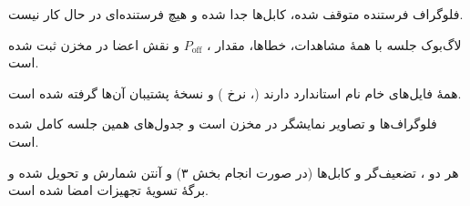 \documentclass[a4paper,11pt]{article}
\begin{document}
\begin{checklist}
\item فلوگراف فرستنده متوقف شده، کابل‌ها جدا شده و هیچ فرستنده‌ای در حال کار نیست.
\item لاگ‌بوک جلسه با همهٔ مشاهدات، خطاها، مقدار
،
$P_{\mathrm{off}}$
و نقش اعضا در مخزن ثبت شده است.
\item همهٔ فایل‌های خام
\IQ{}
نام استاندارد دارند
(،
نرخ
)
و نسخهٔ پشتیبان آن‌ها گرفته شده است.
\item فلوگراف‌ها و تصاویر نمایشگر در مخزن است و جدول‌های همین جلسه کامل شده است.
\item هر دو
،
تضعیف‌گر و کابل‌ها (در صورت انجام بخش ۳) و آنتن شمارش و تحویل شده و برگهٔ تسویهٔ تجهیزات امضا شده است.
\end{checklist}






\end{document}
